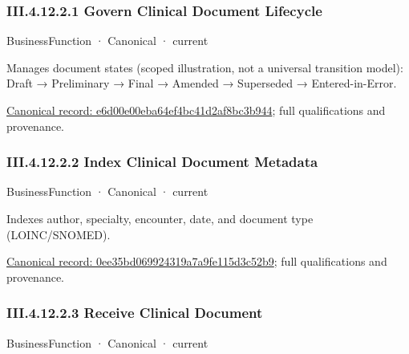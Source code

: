 \subsubsection*{III.4.12.2.1 Govern Clinical Document Lifecycle}
\label{navigation:III.4.12.2.1}

\label{element:e6d00e00eba64ef4bc41d2af8bc3b944}
{\small BusinessFunction · Canonical · current}\par

Manages document states (scoped illustration, not a universal transition model): Draft → Preliminary → Final → Amended → Superseded → Entered-in-Error.


{\footnotesize \href{../../../../continuum/business/business-function/e6d00e00eba64ef4bc41d2af8bc3b944.md}{Canonical record: e6d00e00eba64ef4bc41d2af8bc3b944}; full qualifications and provenance.}\par
\subsubsection*{III.4.12.2.2 Index Clinical Document Metadata}
\label{navigation:III.4.12.2.2}

\label{element:0ee35bd069924319a7a9fe115d3c52b9}
{\small BusinessFunction · Canonical · current}\par

Indexes author, specialty, encounter, date, and document type (LOINC/SNOMED).


{\footnotesize \href{../../../../continuum/business/business-function/0ee35bd069924319a7a9fe115d3c52b9.md}{Canonical record: 0ee35bd069924319a7a9fe115d3c52b9}; full qualifications and provenance.}\par
\subsubsection*{III.4.12.2.3 Receive Clinical Document}
\label{navigation:III.4.12.2.3}

\label{element:d8f80ba3a5a9401b84e6476cbec8cace}
{\small BusinessFunction · Canonical · current}\par

